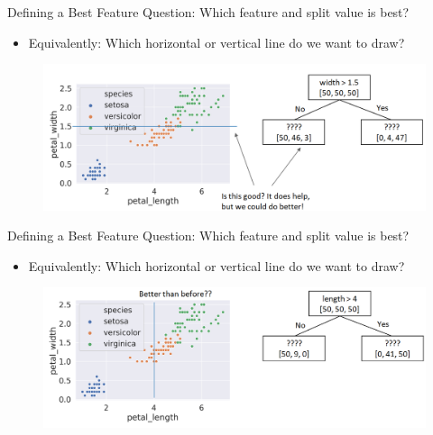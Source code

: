 \documentclass[aspectratio=169]{../latex_main/tntbeamer}  %
\begin{document}
	\begin{frame}{Defining a Best Feature}
	    Question: Which feature and split value is best?
	    \begin{itemize}
	        \item  Equivalently: Which horizontal or vertical line do we want to draw?
	    \end{itemize}
	    \begin{figure}
	        \centering
	        \includegraphics[scale=.4]{Bild43}
	    \end{figure}
	\end{frame}
	
	\begin{frame}{Defining a Best Feature}
	    Question: Which feature and split value is best?
	    \begin{itemize}
	        \item  Equivalently: Which horizontal or vertical line do we want to draw?
	    \end{itemize}
	    \begin{figure}
	        \centering
	        \includegraphics[scale=.4]{Bild44}
	    \end{figure}
	\end{frame}
	
\end{document}
